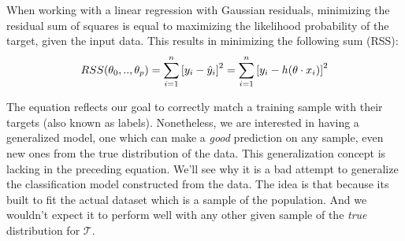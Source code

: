 When working with a linear regression with Gaussian residuals, minimizing the residual sum of squares is equal to maximizing the likelihood probability of the target, given the input data.
This results in minimizing the following sum (RSS):
\begin{equation}\label{eq:rss}
RSS(\theta_0,..,\theta_p) = \sum_{i=1}^n {[y_i - \hat{y}_i ] }^2 \\
= \sum_{i=1}^n  {[y_i - h( \theta \cdot x_i)] }^2
\end{equation}

The equation reflects our goal to correctly match a training sample with their targets (also known as labels).
Nonetheless, we are interested in having a generalized model, one which can make a \textit{good} prediction on any sample, even new ones from the true distribution of the data.
This generalization concept is lacking in the preceding equation.
We'll see why it is a bad attempt to generalize the classification model constructed from the data.
The idea is that because its built to fit the actual dataset which is a sample of the population.
And we wouldn't expect it to perform well with any other given sample of the \textit{true} distribution for $\mathcal{T}$.
